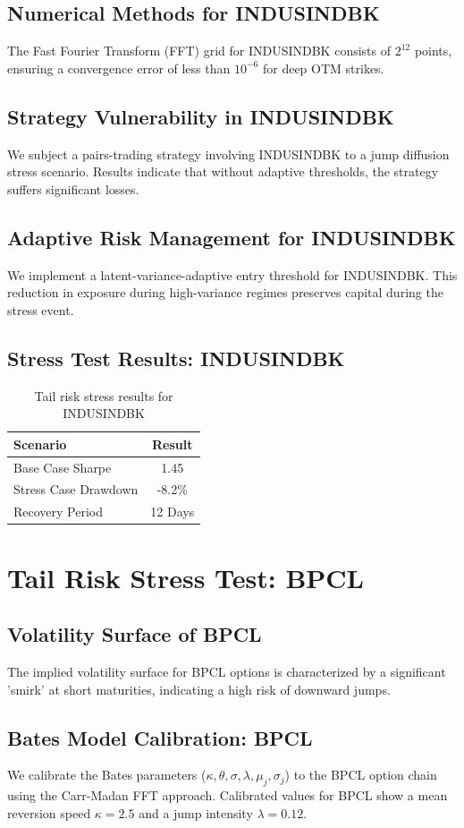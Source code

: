 \documentclass[12pt,a4paper,twoside]{article}
\begin{document}
\subsection{Numerical Methods for INDUSINDBK}
The Fast Fourier Transform (FFT) grid for INDUSINDBK consists of $2^{12}$ points, ensuring a convergence error of less than $10^{-6}$ for deep OTM strikes.
\subsection{Strategy Vulnerability in INDUSINDBK}
We subject a pairs-trading strategy involving INDUSINDBK to a jump diffusion stress scenario. Results indicate that without adaptive thresholds, the strategy suffers significant losses.
\subsection{Adaptive Risk Management for INDUSINDBK}
We implement a latent-variance-adaptive entry threshold for INDUSINDBK. This reduction in exposure during high-variance regimes preserves capital during the stress event.
\subsection{Stress Test Results: INDUSINDBK}
\begin{table}[H]
\centering
\begin{tabular}{|l|c|}
\hline
Scenario & Result \\
\hline
Base Case Sharpe & 1.45 \\
Stress Case Drawdown & -8.2\% \\
Recovery Period & 12 Days \\
\hline
\end{tabular}
\caption{Tail risk stress results for INDUSINDBK}
\end{table}
\newpage

\section{Tail Risk Stress Test: BPCL}
\subsection{Volatility Surface of BPCL}
The implied volatility surface for BPCL options is characterized by a significant 'smirk' at short maturities, indicating a high risk of downward jumps.
\subsection{Bates Model Calibration: BPCL}
We calibrate the Bates parameters ($\kappa, \theta, \sigma, \lambda, \mu_j, \sigma_j$) to the BPCL option chain using the Carr-Madan FFT approach.
Calibrated values for BPCL show a mean reversion speed $\kappa = 2.5$ and a jump intensity $\lambda = 0.12$.
\end{document}
